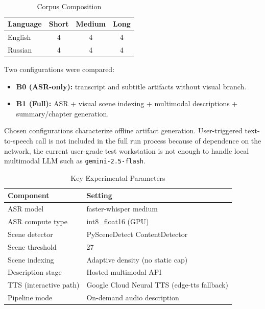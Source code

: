 ﻿﻿\documentclass[conference]{IEEEtran}
\begin{document}
\begin{table}[t]
\caption{Corpus Composition}
\label{tab:corpus_comp}
\centering
\footnotesize
\setlength{\tabcolsep}{5pt}
\begin{tabular}{lccc}
\toprule
\textbf{Language} & \textbf{Short} & \textbf{Medium} & \textbf{Long} \\
\midrule
English & 4 & 4 & 4 \\
Russian & 4 & 4 & 4 \\
\bottomrule
\end{tabular}
\end{table}

Two configurations were compared:
\begin{itemize}
\item \textbf{B0 (ASR-only):} transcript and subtitle artifacts without visual branch.
\item \textbf{B1 (Full):} ASR + visual scene indexing + multimodal descriptions + summary/chapter generation.
\end{itemize}
Chosen configurations characterize offline artifact generation. User-triggered text-to-speech call is not included in the full run process because of dependence on the network, the current user-grade test workstation is not enough to handle local multimodal LLM such as \texttt{gemini-2.5-flash}.

\begin{table}[t]
\caption{Key Experimental Parameters}
\label{tab:exp_params}
\centering
\footnotesize
\setlength{\tabcolsep}{4.5pt}
\begin{tabular}{ll}
\toprule
\textbf{Component} & \textbf{Setting} \\
\midrule
ASR model & faster-whisper medium \\
ASR compute type & int8\_float16 (GPU) \\
Scene detector & PySceneDetect ContentDetector \\
Scene threshold & 27 \\
Scene indexing & Adaptive density (no static cap) \\
Description stage & Hosted multimodal API \\
TTS (interactive path) & Google Cloud Neural TTS (edge-tts fallback) \\
Pipeline mode & On-demand audio description \\
\bottomrule
\end{tabular}
\end{table}
\end{document}
